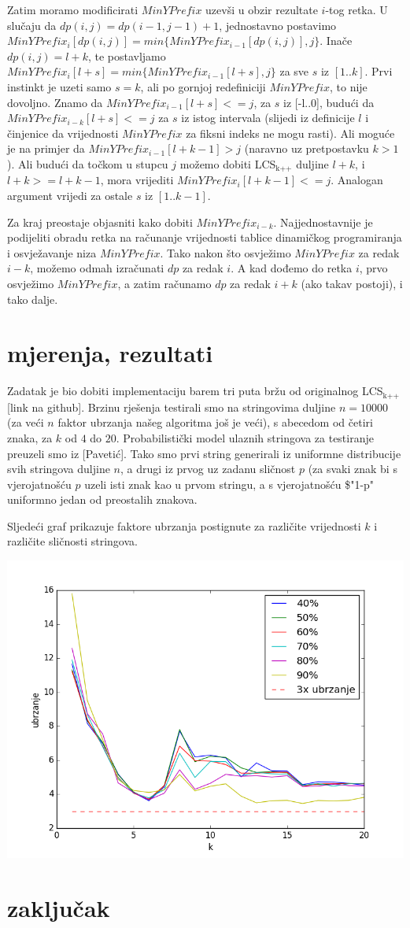 \documentclass[11pt]{article}
\begin{document}
Zatim moramo modificirati $MinYPrefix$ uzevši u obzir rezultate
$i$-tog retka. U slučaju da $dp(i, j) = dp(i-1,j-1)+1$,
jednostavno postavimo $MinYPrefix_i[dp(i,j)] =
    min\{MinYPrefix_{i-1}[dp(i,j)], j\}$.  Inače $dp(i, j) = l+k$, te
postavljamo $MinYPrefix_i[l+s] = min\{MinYPrefix_{i-1}[l+s], j\}$
za sve $s$ iz $[1..k]$. Prvi instinkt je uzeti samo $s = k$, ali
po gornjoj redefiniciji $MinYPrefix$, to nije dovoljno. Znamo da
$MinYPrefix_{i-1}[l+s] <= j$, za $s$ iz [-l..0], budući da
$MinYPrefix_{i-k}[l+s] <= j$ za $s$ iz istog intervala (slijedi iz
definicije $l$ i činjenice da vrijednosti $MinYPrefix$ za fiksni
indeks ne mogu rasti). Ali moguće je na primjer da
$MinYPrefix_{i-1}[l+k-1] > j$ (naravno uz pretpostavku $k > 1$).
Ali budući da točkom u stupcu $j$ možemo dobiti LCS$_{\text{k++}}$ duljine
$l+k$, i $l+k >= l+k-1$, mora vrijediti $MinYPrefix_i[l+k-1] <=
    j$. Analogan argument vrijedi za ostale $s$ iz $[1..k-1]$.

Za kraj preostaje objasniti kako dobiti $MinYPrefix_{i-k}$.
Najjednostavnije je podijeliti obradu retka na računanje
vrijednosti tablice dinamičkog programiranja i osvježavanje niza
$MinYPrefix$. Tako nakon što osvježimo $MinYPrefix$ za redak
$i-k$, možemo odmah izračunati $dp$ za redak $i$. A kad dođemo do
retka $i$, prvo osvježimo $MinYPrefix$, a zatim računamo $dp$ za
redak $i+k$ (ako takav postoji), i tako dalje.

\section{mjerenja, rezultati}
\label{sec-3}
Zadatak je bio dobiti implementaciju barem tri puta bržu od
originalnog LCS$_{\text{k++}}$ [link na github]. Brzinu rješenja testirali
smo na stringovima duljine $n = 10000$ (za veći $n$ faktor ubrzanja
našeg algoritma još je veći), s abecedom od četiri znaka, za $k$ od
$4$ do $20$. Probabilistički model ulaznih stringova za testiranje
preuzeli smo iz [Pavetić]. Tako smo prvi string generirali iz
uniformne distribucije svih stringova duljine $n$, a drugi iz prvog
uz zadanu sličnost $p$ (za svaki znak bi s vjerojatnošću $p$ uzeli
isti znak kao u prvom stringu, a s vjerojatnošću \$"1-p" uniformno
jedan od preostalih znakova.

Sljedeći graf prikazuje faktore ubrzanja postignute za različite
vrijednosti $k$ i različite sličnosti stringova. 

\includegraphics[width=.9\linewidth]{../test/speedplot.png}


\section{zaključak}
\label{sec-4}
\end{document}
